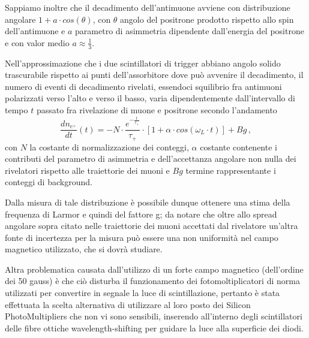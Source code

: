 Sappiamo inoltre che il decadimento dell'antimuone avviene con distribuzione angolare $1+a \cdot cos(\theta)$, con $\theta$ angolo del positrone prodotto rispetto allo spin dell'antimuone e $a$ parametro di asimmetria dipendente dall'energia del positrone e con valor medio $a\approx\frac{1}{3}$. \cite{bib:AJP-Amsler} \par
Nell'approssimazione che i due scintillatori di trigger abbiano angolo solido trascurabile rispetto ai punti dell'assorbitore dove può avvenire il decadimento, il numero di eventi di decadimento rivelati, essendoci squilibrio fra antimuoni polarizzati verso l'alto e verso il basso, varia dipendentemente dall'intervallo di tempo $t$ passato fra rivelazione di muone e positrone secondo l'andamento
\begin{equation}
	\frac{dn_{e^+}}{dt}(t)=-N \cdot\frac{e^{-\frac{t}{\tau_+}}}{\tau_+}\cdot[1+\alpha\cdot cos(\omega_L \cdot t)]+Bg \, ,
	\label{eq:dndt}
\end{equation}
con $N$ la costante di normalizzazione dei conteggi, $\alpha$ costante contenente i contributi del parametro di asimmetria e dell'accettanza angolare non nulla dei rivelatori rispetto alle traiettorie dei muoni e $Bg$ termine rappresentante i conteggi di background. \par
Dalla misura di tale distribuzione è possibile dunque ottenere una stima della frequenza di Larmor e quindi del fattore g; da notare che oltre allo spread angolare sopra citato nelle traiettorie dei muoni accettati dal rivelatore un'altra fonte di incertezza per la misura può essere una non uniformità nel campo magnetico utilizzato, che si dovrà studiare. \par
Altra problematica causata dall'utilizzo di un forte campo magnetico (dell'ordine dei 50 gauss) è che ciò disturba il funzionamento dei fotomoltiplicatori di norma utilizzati per convertire in segnale la luce di scintillazione, pertanto è stata effettuata la scelta alternativa di utilizzare al loro posto dei Silicon PhotoMultipliers che non vi sono sensibili, inserendo all'interno degli scintillatori delle fibre ottiche wavelength-shifting per guidare la luce alla superficie dei diodi.
